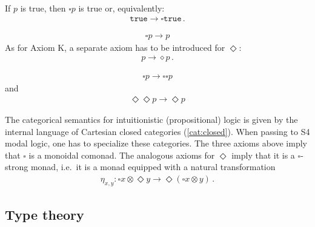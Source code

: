     \begin{axiom}[Necessitation]
        If $p$ is true, then $\square p$ is true or, equivalently:
        \begin{gather}
            \mathtt{true}\rightarrow\square\mathtt{true}\,.
        \end{gather}
    \end{axiom}

    \begin{axiom}[T]
        \begin{gather}
            \square p\rightarrow p
        \end{gather}
        As for Axiom K, a separate axiom has to be introduced for $\Diamond$:
        \begin{gather}
            p\rightarrow\diamond p\,.
        \end{gather}
    \end{axiom}

    \begin{axiom}[S4]
        \begin{gather}
            \square p\rightarrow\square\square p
        \end{gather}
        and
        \begin{gather}
            \Diamond\Diamond p\rightarrow\Diamond p
        \end{gather}
    \end{axiom}

    The categorical semantics for intuitionistic (propositional) logic is given by the internal language of Cartesian closed categories (\cref{cat:closed}). When passing to S4 modal logic, one has to specialize these categories. The three axioms above imply that $\square$ is a monoidal comonad. The analogous axioms for $\Diamond$ imply that it is a $\square$-strong monad, i.e.~it is a monad equipped with a natural transformation
    \begin{gather}
        \eta_{x,y}:\square x\otimes\Diamond y\rightarrow\Diamond(\square x\otimes y)\,.
    \end{gather}

\subsection{Type theory}\label{section:modal_type_theory}


